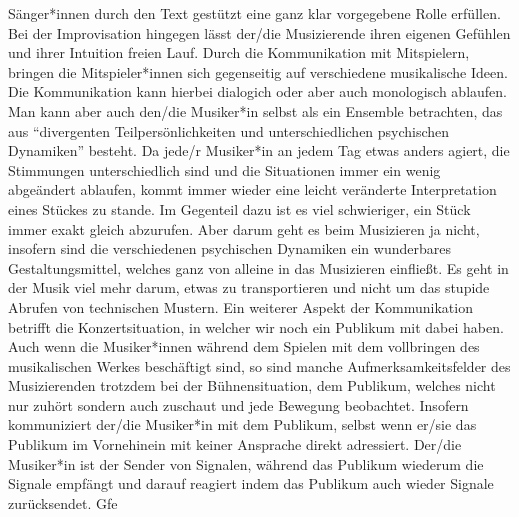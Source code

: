 Sänger*innen durch den Text gestützt eine ganz klar vorgegebene Rolle erfüllen.
Bei der Improvisation hingegen lässt der/die Musizierende ihren eigenen Gefühlen
und ihrer Intuition freien Lauf. Durch die Kommunikation mit Mitspielern,
bringen die Mitspieler*innen sich gegenseitig auf verschiedene musikalische
Ideen. Die Kommunikation kann hierbei dialogich oder aber auch monologisch
ablaufen. \autocite[61]{doerne:umfassend_musizieren} Man kann aber auch den/die
Musiker*in selbst als ein Ensemble betrachten, das aus \enquote{divergenten
Teilpersönlichkeiten und unterschiedlichen psychischen Dynamiken} besteht.
\autocite[64]{doerne:umfassend_musizieren} Da jede/r Musiker*in an jedem Tag
etwas anders agiert, die Stimmungen unterschiedlich sind und die Situationen
immer ein wenig abgeändert ablaufen, kommt immer wieder eine leicht veränderte
Interpretation eines Stückes zu stande. Im Gegenteil dazu ist es viel
schwieriger, ein Stück immer exakt gleich abzurufen. Aber darum geht es beim
Musizieren ja nicht, insofern sind die verschiedenen psychischen Dynamiken ein
wunderbares Gestaltungsmittel, welches ganz von alleine in das Musizieren
einfließt. Es geht in der Musik viel mehr darum, etwas zu transportieren und
nicht um das stupide Abrufen von technischen Mustern. Ein weiterer Aspekt der
Kommunikation betrifft die Konzertsituation, in welcher wir noch ein Publikum
mit dabei haben. Auch wenn die Musiker*innen während dem Spielen mit dem
vollbringen des musikalischen Werkes beschäftigt sind, so sind manche
Aufmerksamkeitsfelder des Musizierenden trotzdem bei der Bühnensituation, dem
Publikum, welches nicht nur zuhört sondern auch zuschaut und jede Bewegung
beobachtet. Insofern kommuniziert der/die Musiker*in mit dem Publikum, selbst
wenn er/sie das Publikum im Vornehinein mit keiner Ansprache direkt adressiert.
Der/die Musiker*in ist der Sender von Signalen, während das Publikum wiederum
die Signale empfängt und darauf reagiert indem das Publikum auch wieder Signale
zurücksendet. Gfe



